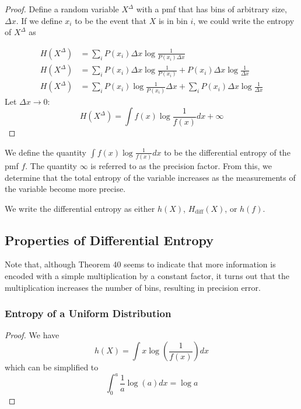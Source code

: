 \documentclass[11pt]{article}
\theoremstyle{definition}
\begin{document}
\begin{proof}

Define a random variable $X^{\Delta}$ with a pmf that has bins of arbitrary size, $\Delta x$. If we define $x_i$ to be the event that $X$ is in bin $i$, we could write the entropy of $X^{\Delta}$ as 

\begin{align*}
H(X^{\Delta}) &= \sum_i P(x_i) \Delta x \log{\frac{1}{P(x_i) \Delta x}}  \\
H(X^{\Delta}) &= \sum_i P(x_i) \Delta x \log{\frac{1}{P(x_i)} } +  P(x_i) \Delta x \log{\frac{1}{\Delta x} } \\
H(X^{\Delta}) &= \sum_i P(x_i) \log{\frac{1}{P(x_i)} } \Delta x +  \sum_i P(x_i) \Delta x \log{\frac{1}{\Delta x} }
\end{align*}
Let $\Delta x \to 0$:
	$$H(X^{\Delta}) = \boxed{ \int f(x) \log{\frac{1}{f(x)}} dx} + \infty$$
	
\end{proof}
\noindent We define the quantity $\int f(x) \log{\frac{1}{f(x)}} dx$ to be the differential entropy of the pmf $f$. The quantity $\infty$ is referred to as the precision factor. From this, we determine that the total entropy of the variable increases as the measurements of the variable become more precise. 

\notation We write the differential entropy as either $h(X)$, $H_{\mathrm{diff}}(X)$, or $h(f)$. 
\subsection{Properties of Differential Entropy}

\remark Note that, although Theorem 40 seems to indicate that more information is encoded with a simple multiplication by a constant factor, it turns out that the multiplication increases the number of bins, resulting in precision error. 

\subsubsection{Entropy of a Uniform Distribution}

\begin{proof}
We have $$h(X) = \int x \log \left(\frac{1}{f(x)} \right) dx$$which can be simplified to $$\int_0^a \frac{1}{a} \log(a) dx = \log a$$
\end{proof}
\end{document}
